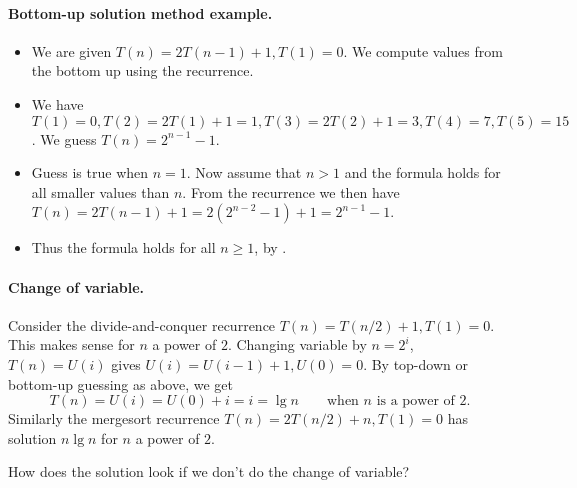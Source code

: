 \paragraph{Bottom-up solution method example.}
\begin{itemize}
\item We are given $T(n) = 2 T(n - 1) + 1, T(1) = 0$. We compute values from the
 bottom up using the recurrence. 
\item We have $T(1) = 0, T(2) = 2T(1) + 1 = 1, T(3) = 2T(2) + 1 = 3, T(4) = 7, 
T(5) = 15$. We guess $T(n) = 2^{n-1} - 1$. 
\item Guess is true when $n = 1$. Now assume that $n > 1$ and the formula holds 
for all smaller values than $n$. From the recurrence we then have 
$T(n) = 2T(n-1) + 1 = 2(2^{n-2} - 1) + 1 = 2^{n-1} - 1$. 
\item Thus the formula holds for all $n\geq 1$, by .
\end{itemize}

\paragraph{Change of variable.}
Consider the divide-and-conquer recurrence $T(n) = T(n/2) + 1, T(1) = 0$. 
This makes sense for $n$ a power of $2$.
Changing variable by $n = 2^i$, $T(n) = U(i)$ 
gives $U(i) = U(i-1) + 1, U(0) = 0$. 
By top-down or bottom-up guessing as above, we get 
$$T(n) = U(i) = U(0) + i = i = \lg n \qquad \text{when } n \text{ is a power of }2\text{.}$$
Similarly the mergesort recurrence $T(n) = 2T(n/2) + n, T(1)  = 0$ 
has solution $n \lg n$ for $n$ a power of $2$.


How does the solution look if we don't do the change of variable?


